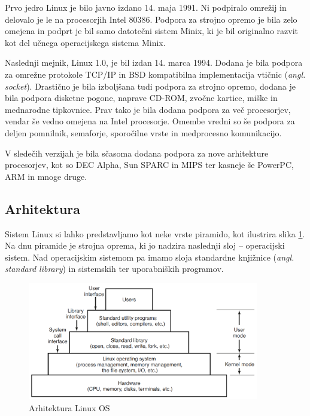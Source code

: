 \documentclass[a4paper,12pt,openright]{book}
\begin{document}
Prvo jedro Linux je bilo javno izdano 14. maja 1991. Ni podpiralo omrežij in delovalo je le na procesorjih Intel 80386.
Podpora za strojno opremo je bila zelo omejena in podprt je bil samo datotečni sistem Minix, ki je bil originalno razvit kot del učnega operacijskega sistema Minix.

Naslednji mejnik, Linux 1.0, je bil izdan 14. marca 1994. Dodana je bila podpora za omrežne protokole TCP/IP in BSD kompatibilna implementacija vtičnic (\textit{angl. socket}).
Drastično je bila izboljšana tudi podpora za strojno opremo, dodana je bila podpora disketne pogone, naprave CD-ROM, zvočne kartice, miške in mednarodne tipkovnice.
Prav tako je bila dodana podpora za več procesorjev, vendar še vedno omejena na Intel procesorje.
Omembe vredni so še podpora za deljen pomnilnik, semaforje, sporočilne vrste in medprocesno komunikacijo.

V sledečih verzijah je bila sčasoma dodana podpora za nove arhitekture procesorjev, kot so DEC Alpha, Sun SPARC in MIPS ter kasneje še PowerPC, ARM in mnoge druge.

\subsection{Arhitektura}

Sistem Linux si lahko predstavljamo kot neke vrste piramido, kot ilustrira slika \ref{fig:linux_architecture}.
Na dnu piramide je strojna oprema, ki jo nadzira naslednji sloj -- operacijski sistem.
Nad operacijskim sistemom pa imamo sloja standardne knjižnice (\textit{angl. standard library}) in sistemskih ter uporabniških programov.

\begin{figure}[h!]
	\begin{center}
		\includegraphics[width=0.9\textwidth]{images/linux_layers.png}
	\end{center}
	\caption{Arhitektura Linux OS \cite{Tanenbaum_Bos_2023}}
	\label{fig:linux_architecture}
\end{figure}
\end{document}
